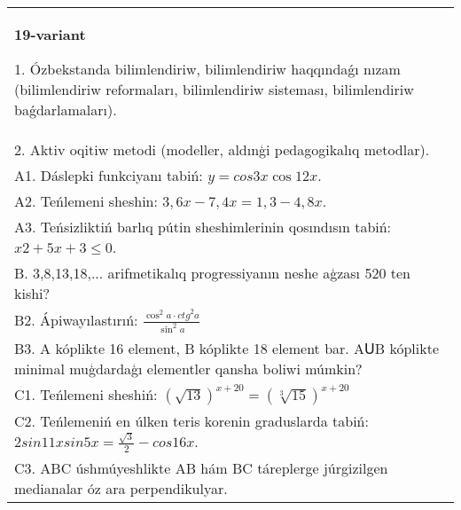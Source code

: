 \documentclass{article}
\begin{document}
\begin{tabular}{m{17cm}}
\textbf{19-variant}

1. Ózbekstanda bilimlendiriw, bilimlendiriw haqqındaǵı nızam (bilimlendiriw reformaları, bilimlendiriw sisteması, bilimlendiriw baǵdarlamaları). \\
2. Aktiv oqitiw metodi (modeller, aldınģi pedagogikalıq metodlar). \\
A1. Dáslepki funkciyanı tabiń: \(y=cos{3x}\cos{12x}\). \\
A2. Teńlemeni sheshin: \(3,6x - 7,4x = 1,3 - 4,8x\). \\
A3. Teńsizliktiń barlıq pútin sheshimlerinin qosındısın tabiń: \(x2 + 5x + 3 \leq 0\). \\
B. 3,8,13,18,... arifmetikalıq progressiyanın neshe aģzası 520 ten kishi? \\
B2. Ápiwayılastırıń: \(\frac{\cos^{2}a \cdot {ctg}^{2}a}{\sin^{2}a}\) \\
B3. A kóplikte 16 element, B kóplikte 18 element bar. AՍB kóplikte minimal muģdardaģı elementler qansha boliwi múmkin? \\
C1. Teńlemeni sheshiń: \((\sqrt{13}) ^{x + 20} = (\sqrt[3]{15}) ^{x + 20}\) \\
C2. Teńlemeniń en úlken teris korenin graduslarda tabiń: \(2sin11xsin5x = \frac{\sqrt{3}}{2} - cos16x\). \\
C3. ABC úshmúyeshlikte AB hám BC táreplerge júrgizilgen medianalar óz ara perpendikulyar. \\

\end{tabular}
\vspace{1cm}
\end{document}
